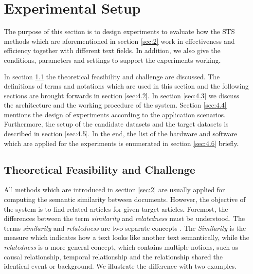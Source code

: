 \section{Experimental Setup}
\label{sec:4}

The purpose of this section is to design experiments to evaluate how the STS methods which are aforementioned in section \ref{sec:2} work in effectiveness and efficiency together with different text fields. In addition, we also give the conditions, parameters and settings to support the experiments working. 

In section \ref{sec:4.1} the theoretical feasibility and challenge are discussed. The definitions of terms and notations which are used in this section and the following sections are brought forwards in section \ref{sec:4.2}. In section \ref{sec:4.3} we discuss the architecture and the working procedure of the system. Section \ref{sec:4.4} mentions the design of experiments according to the application scenarios. Furthermore, the setup of the candidate datasets and the target datasets is described in section \ref{sec:4.5}. In the end, the list of the hardware and software which are applied for the experiments is enumerated in section \ref{sec:4.6} briefly.

\bigbreak

\subsection{Theoretical Feasibility and Challenge}
\label{sec:4.1}

All methods which are introduced in section \ref{sec:2} are usually applied for computing the semantic similarity between documents. However, the objective of the system is to find related articles for given target articles. Foremost, the differences between the term \textit{similarity} and \textit{relatedness} must be understood. The terms \textit{similarity} and \textit{relatedness} are two separate concepts \cite{pedersen2007measures}. The \textit{Similarity} is the measure which indicates how a text looks like another text semantically, while the \textit{relatedness} is a more general concept, which contains multiple notions, such as causal relationship, temporal relationship and the relationship shared the identical event or background. We illustrate the difference with two examples.

